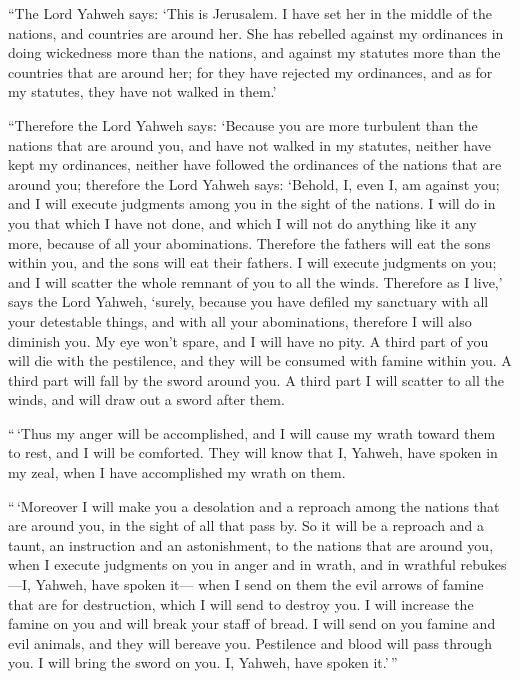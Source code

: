  ``The Lord Yahweh says: `This is Jerusalem. I have set her
in the middle of the nations, and countries are around her. 
She has rebelled against my ordinances in doing wickedness more than the
nations, and against my statutes more than the countries that are around
her; for they have rejected my ordinances, and as for my statutes, they
have not walked in them.'

 ``Therefore the Lord Yahweh says: `Because you are more
turbulent than the nations that are around you, and have not walked in
my statutes, neither have kept my ordinances, neither have followed the
ordinances of the nations that are around you;  therefore
the Lord Yahweh says: `Behold, I, even I, am against you; and I will
execute judgments among you in the sight of the nations.  I
will do in you that which I have not done, and which I will not do
anything like it any more, because of all your abominations.
 Therefore the fathers will eat the sons within you, and
the sons will eat their fathers. I will execute judgments on you; and I
will scatter the whole remnant of you to all the winds. 
Therefore as I live,' says the Lord Yahweh, `surely, because you have
defiled my sanctuary with all your detestable things, and with all your
abominations, therefore I will also diminish you. My eye won't spare,
and I will have no pity.  A third part of you will die with
the pestilence, and they will be consumed with famine within you. A
third part will fall by the sword around you. A third part I will
scatter to all the winds, and will draw out a sword after them.

 ``\,`Thus my anger will be accomplished, and I will cause
my wrath toward them to rest, and I will be comforted. They will know
that I, Yahweh, have spoken in my zeal, when I have accomplished my
wrath on them.

 ``\,`Moreover I will make you a desolation and a reproach
among the nations that are around you, in the sight of all that pass by.
 So it will be a reproach and a taunt, an instruction and
an astonishment, to the nations that are around you, when I execute
judgments on you in anger and in wrath, and in wrathful rebukes---I,
Yahweh, have spoken it---  when I send on them the evil
arrows of famine that are for destruction, which I will send to destroy
you. I will increase the famine on you and will break your staff of
bread.  I will send on you famine and evil animals, and
they will bereave you. Pestilence and blood will pass through you. I
will bring the sword on you. I, Yahweh, have spoken it.'\,''


